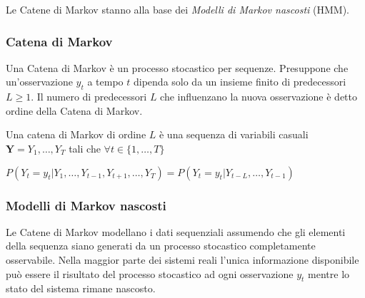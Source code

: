 \documentclass[../main.tex]{subfiles}
\begin{document}
Le Catene di Markov stanno alla base dei \textit{Modelli di Markov nascosti} (HMM).

\subsubsection{Catena di Markov}
Una Catena di Markov è un processo stocastico per sequenze. Presuppone che un'osservazione ${y} _ {t}$ a tempo $t$ dipenda solo da un insieme finito di predecessori $L \geq 1$. Il numero di predecessori $L$ che influenzano la nuova osservazione è detto ordine della Catena di Markov.

Una catena di Markov di ordine $L$ è una sequenza di variabili casuali $\mathbf { Y } = Y _ { 1 } , \ldots , Y _ { T }$ tali che $\forall t \in \{ 1 , \ldots , T \}$

\begin{center}
				\begin{math}
								P \left( Y _ { t } = y _ { t } | Y _ { 1 } , \ldots , Y _ { t - 1 } , Y _ { t + 1 } , \ldots , Y _ { T } \right) = P \left( Y _ { t } = y _ { t } | Y _ { t - L } , \ldots , Y _ { t - 1 } \right)
				\end{math}
\end{center}

\subsubsection{Modelli di Markov nascosti}
Le Catene di Markov modellano i dati sequenziali assumendo che gli elementi della sequenza siano generati da un processo stocastico completamente osservabile. Nella maggior parte dei sistemi reali l'unica informazione disponibile può essere il risultato del processo stocastico ad ogni osservazione ${y} _ {t}$ mentre lo stato del sistema rimane nascosto. 
\end{document}
